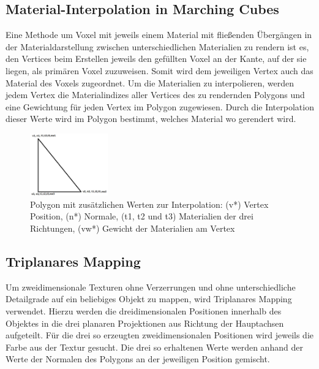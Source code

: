 \subsection{Material-Interpolation in Marching Cubes}
\label{subsec:materialInterpolation}
Eine Methode um Voxel mit jeweils einem Material mit fließenden Übergängen in der Materialdarstellung zwischen unterschiedlichen Materialien zu rendern ist es, den Vertices beim Erstellen jeweils den gefüllten Voxel an der Kante, auf der sie liegen, als primären Voxel zuzuweisen. Somit wird dem jeweiligen Vertex auch das Material des Voxels zugeordnet. Um die Materialien zu interpolieren, werden jedem Vertex die Materialindizes aller Vertices des zu rendernden Polygons und eine Gewichtung für jeden Vertex im Polygon zugewiesen. Durch die Interpolation dieser Werte wird im Polygon bestimmt, welches Material wo gerendert wird. \cite{iomt}

\begin{figure}[H]
			\centering
			\includegraphics[width=0.3\textwidth]{figures/triangleCorrected}
			\caption[Polygon mit zusätzlichen Werten zur Interpolation\cite{iomt}]{Polygon mit zusätzlichen Werten zur Interpolation: (v*) Vertex Position, (n*) Normale, (t1, t2 und t3) Materialien der drei Richtungen, (vw*) Gewicht der Materialien am Vertex \label{PolygonMitZusatzWerten}}
			\end{figure}

\subsection{Triplanares Mapping}
\label{subsec:triplanaresMapping}
Um zweidimensionale Texturen ohne Verzerrungen und ohne unterschiedliche Detailgrade auf ein beliebiges Objekt zu mappen, wird Triplanares Mapping verwendet. Hierzu werden die dreidimensionalen Positionen innerhalb des Objektes in die drei planaren Projektionen aus Richtung der Hauptachsen aufgeteilt. Für die drei so erzeugten zweidimensionalen Positionen wird jeweils die Farbe aus der Textur gesucht. Die drei so erhaltenen Werte werden anhand der Werte der Normalen des Polygons an der jeweiligen Position gemischt. \cite{tpm}



